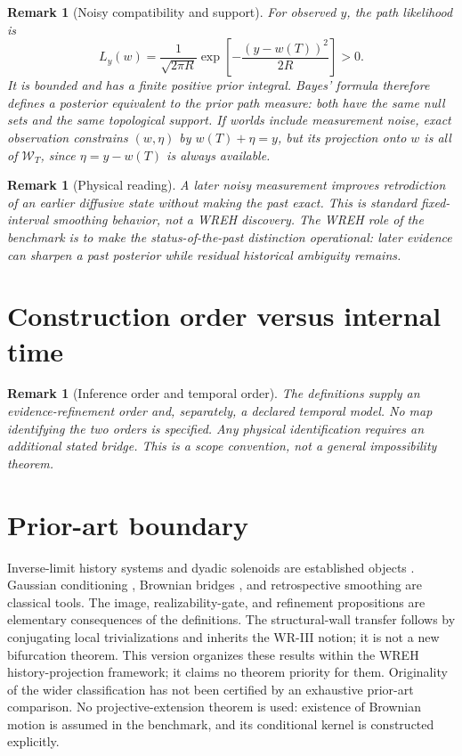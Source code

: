 \documentclass[11pt]{article}
\newtheorem{remark}[definition]{Remark}
\newcommand{\Wcal}{\mathcal W}
\begin{document}
\begin{remark}[Noisy compatibility and support]
For observed $y$, the path likelihood is
\[
L_y(w)=\frac{1}{\sqrt{2\pi R}}
\exp\!\left[-\frac{(y-w(T))^2}{2R}\right]>0.
\]
It is bounded and has a finite positive prior integral. Bayes' formula
therefore defines a posterior equivalent to the prior path measure:
both have the same null sets and the same topological support.
If worlds include measurement noise, exact observation constrains
$(w,\eta)$ by $w(T)+\eta=y$, but its projection onto $w$ is all of
$\Wcal_T$, since $\eta=y-w(T)$ is always available.
\end{remark}

\begin{remark}[Physical reading]
A later noisy measurement improves retrodiction of an earlier diffusive state without making
the past exact. This is standard fixed-interval smoothing behavior, not a WREH discovery.
The WREH role of the benchmark is to make the status-of-the-past distinction operational:
later evidence can sharpen a past posterior while residual historical ambiguity remains.
\end{remark}

\section{Construction order versus internal time}
\begin{remark}[Inference order and temporal order]
The definitions supply an evidence-refinement order and, separately,
a declared temporal model. No map identifying the two orders is
specified. Any physical identification requires an additional stated
bridge. This is a scope convention, not a general impossibility theorem.
\end{remark}

\section{Prior-art boundary}
Inverse-limit history systems and dyadic solenoids are established
objects \cite[Section 1]{ClarkFokkink2004}. Gaussian conditioning
\cite[Appendix A.1]{SarkkaSvensson2023}, Brownian bridges
\cite{Pitman2003}, and retrospective smoothing
\cite{RauchTungStriebel1965} are classical tools.
The image, realizability-gate, and refinement propositions are
elementary consequences of the definitions. The structural-wall
transfer follows by conjugating local trivializations and inherits
the WR-III notion; it is not a new bifurcation theorem. This version organizes these results within
the WREH history-projection framework; it claims no theorem priority
for them. Originality of the wider classification has not been
certified by an exhaustive prior-art comparison.
No projective-extension theorem is used: existence of Brownian motion
is assumed in the benchmark, and its conditional kernel is constructed
explicitly.
\end{document}
